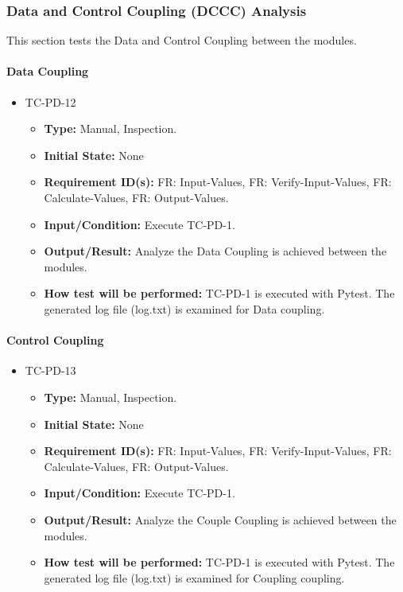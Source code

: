 \documentclass[12pt, titlepage]{article}
\begin{document}
\subsubsection{Data and Control Coupling (DCCC) Analysis}

This section tests the Data and Control Coupling between the modules. 

\paragraph{Data Coupling}
\begin{itemize}
\item{TC-PD-12\\}
\begin{itemize}
\item{\textbf{Type:}} Manual, Inspection.
					
\item{\textbf{Initial State:}} None

\item{\textbf{Requirement ID(s):}} FR: Input-Values, FR: Verify-Input-Values, FR: Calculate-Values, FR: Output-Values.
					
\item{\textbf{Input/Condition:}}  Execute TC-PD-1. 
					
\item{\textbf{Output/Result:}} Analyze the Data Coupling is achieved between the modules.

\item{\textbf{How test will be performed:}}  TC-PD-1 is executed with Pytest. The generated log file (log.txt)
is examined for Data coupling.
\end{itemize}
\end{itemize}

\paragraph{Control Coupling}
\begin{itemize}
\item{TC-PD-13\\}
\begin{itemize}
\item{\textbf{Type:}} Manual, Inspection.
					
\item{\textbf{Initial State:}} None

\item{\textbf{Requirement ID(s):}} FR: Input-Values, FR: Verify-Input-Values, FR: Calculate-Values, FR: Output-Values.
					
\item{\textbf{Input/Condition:}}  Execute TC-PD-1. 
					
\item{\textbf{Output/Result:}} Analyze the Couple Coupling is achieved between the modules.

\item{\textbf{How test will be performed:}}  TC-PD-1 is executed with Pytest. The generated log file (log.txt)
is examined for Coupling coupling.
\end{itemize}
\end{itemize}
\end{document}
